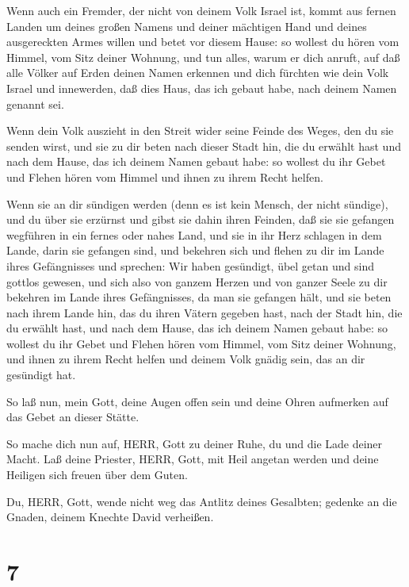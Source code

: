  Wenn auch ein Fremder, der nicht von deinem Volk Israel
ist, kommt aus fernen Landen um deines großen Namens und deiner
mächtigen Hand und deines ausgereckten Armes willen und betet vor diesem
Hause:  so wollest du hören vom Himmel, vom Sitz deiner
Wohnung, und tun alles, warum er dich anruft, auf daß alle Völker auf
Erden deinen Namen erkennen und dich fürchten wie dein Volk Israel und
innewerden, daß dies Haus, das ich gebaut habe, nach deinem Namen
genannt sei.

 Wenn dein Volk auszieht in den Streit wider seine Feinde
des Weges, den du sie senden wirst, und sie zu dir beten nach dieser
Stadt hin, die du erwählt hast und nach dem Hause, das ich deinem Namen
gebaut habe:  so wollest du ihr Gebet und Flehen hören vom
Himmel und ihnen zu ihrem Recht helfen.

 Wenn sie an dir sündigen werden (denn es ist kein Mensch,
der nicht sündige), und du über sie erzürnst und gibst sie dahin ihren
Feinden, daß sie sie gefangen wegführen in ein fernes oder nahes Land,
 und sie in ihr Herz schlagen in dem Lande, darin sie
gefangen sind, und bekehren sich und flehen zu dir im Lande ihres
Gefängnisses und sprechen: Wir haben gesündigt, übel getan und sind
gottlos gewesen,  und sich also von ganzem Herzen und von
ganzer Seele zu dir bekehren im Lande ihres Gefängnisses, da man sie
gefangen hält, und sie beten nach ihrem Lande hin, das du ihren Vätern
gegeben hast, nach der Stadt hin, die du erwählt hast, und nach dem
Hause, das ich deinem Namen gebaut habe:  so wollest du ihr
Gebet und Flehen hören vom Himmel, vom Sitz deiner Wohnung, und ihnen zu
ihrem Recht helfen und deinem Volk gnädig sein, das an dir gesündigt
hat.

 So laß nun, mein Gott, deine Augen offen sein und deine
Ohren aufmerken auf das Gebet an dieser Stätte.

 So mache dich nun auf, HERR, Gott zu deiner Ruhe, du und
die Lade deiner Macht. Laß deine Priester, HERR, Gott, mit Heil angetan
werden und deine Heiligen sich freuen über dem Guten.

 Du, HERR, Gott, wende nicht weg das Antlitz deines
Gesalbten; gedenke an die Gnaden, deinem Knechte David verheißen.

\hypertarget{section-6}{%
\section{7}\label{section-6}}

